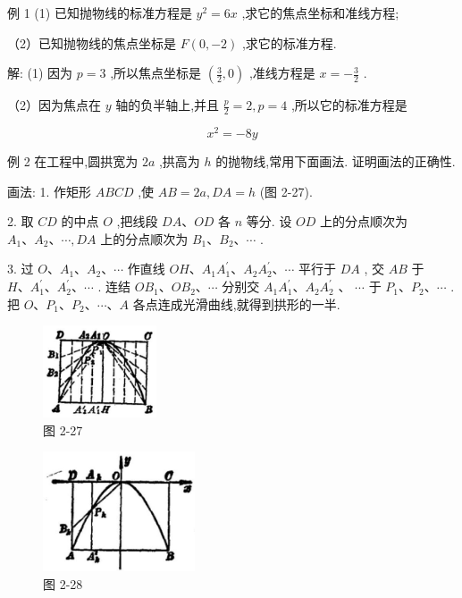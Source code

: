 \documentclass[lang=cn,newtx,10pt,scheme=chinese]{elegantbook}
\begin{document}
例 1 (1) 已知抛物线的标准方程是 \({y}^{2} = {6x}\) ,求它的焦点坐标和准线方程;

（2）已知抛物线的焦点坐标是 \(F\left( {0, - 2}\right)\) ,求它的标准方程.

解: (1) 因为 \(p = 3\) ,所以焦点坐标是 \(\left( {\frac{3}{2},0}\right)\) ,准线方程是 \(x = - \frac{3}{2}\) .

（2）因为焦点在 \(y\) 轴的负半轴上,并且 \(\frac{p}{2} = 2,p = 4\) ,所以它的标准方程是

\[
    {x}^{2} = - {8y}
\]

例 2 在工程中,圆拱宽为 \({2a}\) ,拱高为 \(h\) 的抛物线,常用下面画法. 证明画法的正确性.

画法: 1. 作矩形 \({ABCD}\) ,使 \({AB} = {2a},{DA} = h\) (图 2-27).

2. 取 \({CD}\) 的中点 \(O\) ,把线段 \({DA}\text{、}{OD}\) 各 \(n\) 等分. 设 \({OD}\) 上的分点顺次为 \({A}_{1}\text{、}{A}_{2}\text{、}\cdots ,{DA}\) 上的分点顺次为 \({B}_{1}\text{、}{B}_{2}\text{、}\cdots\) .

3. 过 \(O\text{、}{A}_{1}\text{、}{A}_{2}\text{、}\cdots\) 作直线 \({OH}\text{、}{A}_{1}{A}_{1}^{\prime }\text{、}{A}_{2}{A}_{2}^{\prime }\text{、}\cdots\) 平行于 \({DA}\) , 交 \({AB}\) 于 \(H\text{、}{A}_{1}^{\prime }\text{、}{A}_{2}^{\prime }\text{、}\cdots\) . 连结 \(O{B}_{1}\text{、}O{B}_{2}\text{、}\cdots\) 分别交 \({A}_{1}{A}_{1}^{\prime }\text{、}{A}_{2}{A}_{2}^{\prime }\) 、 \(\cdots\) 于 \({P}_{1}\text{、}{P}_{2}\text{、}\cdots\) . 把 \(O\text{、}{P}_{1}\text{、}{P}_{2}\text{、}\cdots \text{、}A\) 各点连成光滑曲线,就得到拱形的一半.

\begin{figure}[h]
  \centering
  \includegraphics[max width=0.3\textwidth]{images/01912cc2-ffb6-728e-9ae7-b113ff05c64b_111_931321.jpg}
  \caption{图 2-27}
\end{figure}



\begin{figure}[h]
  \centering
  \includegraphics[max width=0.4\textwidth]{images/01912cc2-ffb6-728e-9ae7-b113ff05c64b_111_586312.jpg}
  \caption{图 2-28}
\end{figure}
\end{document}
